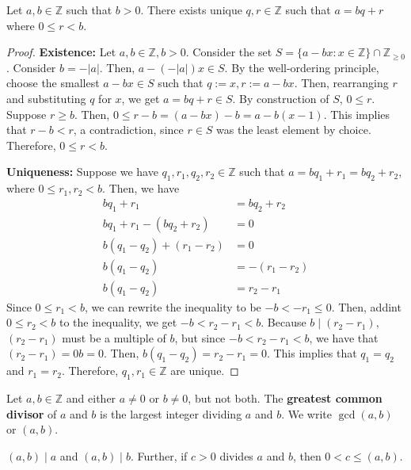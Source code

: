 \documentclass [12pt] {article}
\newcommand{\Z}{\mathbb{Z}}
\newenvironment{theorem}[1]{\begin{tcolorbox}[title={Theorem #1}]}{\end{tcolorbox}}
\newenvironment{definition}[1]{\begin{tcolorbox}[title={Definition: #1},colback=green!5!white,colframe=black!75!green]}{\end{tcolorbox}}
\renewcommand{\bf}[1]{\textbf{{#1}}}
\begin{document}
\begin{theorem}{(Division Algorithm)}
    \label{thm:divalgo}
    Let $a, b \in \Z$ such that $b > 0$. There exists unique $q, r \in \Z$ such that $a = bq + r$
    where $0 \leq r < b$.
\end{theorem}
\begin{proof}
    \bf{Existence:} 
    Let $a, b \in \Z, b > 0$. Consider the set $S = \{ a - bx : x \in \Z \} \cap \Z_{\geq 0}$.
    Consider $b = -|a|$. Then, $a - (-|a|)x \in S$. By the well-ordering principle, choose the 
    smallest $a - bx \in S$ such that $q := x, r := a - bx$. Then, rearranging $r$ and substituting
    $q$ for $x$, we get $a = bq + r \in S$. By construction of $S$, $0 \leq r$. Suppose $r \geq b$.
    Then, $0 \leq r - b = (a - bx) - b = a - b(x - 1)$. This implies that $r - b < r$, a
    contradiction, since $r \in S$ was the least element by choice. Therefore, $0 \leq r < b$.
    \vspace{0.5em}

    \bf{Uniqueness:}
    Suppose we have $q_1, r_1, q_2, r_2 \in \Z$ such that $a = bq_1 + r_1 = bq_2 + r_2$, where 
    $0 \leq r_1, r_2 < b$. Then, we have
    \begin{align*}
        bq_1 + r_1 &= bq_2 + r_2 \\
        bq_1 + r_1 - (bq_2 + r_2) &= 0 \\
        b(q_1 - q_2) + (r_1 - r_2) &= 0 \\
        b(q_1 - q_2) &= -(r_1 - r_2) \\
        b(q_1 - q_2) &= r_2 - r_1
    \end{align*}
    Since $0 \leq r_1 < b$, we can rewrite the inequality to be $-b < -r_1 \leq 0$. Then, addint $0
    \leq r_2 < b$ to the inequality, we get $-b < r_2 - r_1 < b$. Because $b \mid (r_2 - r_1)$,
    $(r_2 - r_1)$ must be a multiple of $b$, but since $-b < r_2 - r_1 < b$, we have that 
    $(r_2 - r_1) = 0b = 0$. Then, $b(q_1 - q_2) = r_2 - r_1 = 0$. This implies that $q_1 = q_2$ and
    $r_1 = r_2$. Therefore, $q_1, r_1 \in \Z$ are unique.
\end{proof}

\begin{definition}{Greatest Common Divisor (gcd)}
    Let $a, b \in \Z$ and either $a \neq 0$ or $b \neq 0$, but not both. The \bf{greatest common
    divisor} of $a$ and $b$ is the largest integer dividing $a$ and $b$. We write $\gcd(a, b)$ or
    $(a, b)$. \vspace{1em}

    $(a, b) \mid a$ and $(a, b) \mid b$. Further, if $c > 0$ divides $a$ and $b$, then $0 < c \leq (a, b)$.
\end{definition}
\end{document}
